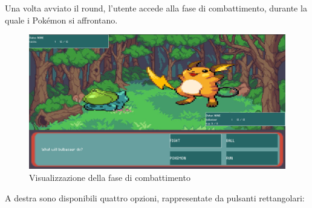 \documentclass[a4paper,12pt]{report}
\begin{document}
{{Una volta avviato il round, l’utente accede alla fase di combattimento, durante la quale i Pokémon si affrontano.

\begin{figure}[H]
  \centering
  \includegraphics[width=\textwidth]{immagini/schermataFight.png}
  \caption{Visualizzazione della fase di combattimento}
  \label{fig:combat_phase}
\end{figure}
A destra sono disponibili quattro opzioni, rappresentate da pulsanti rettangolari:

}}
\end{document}
